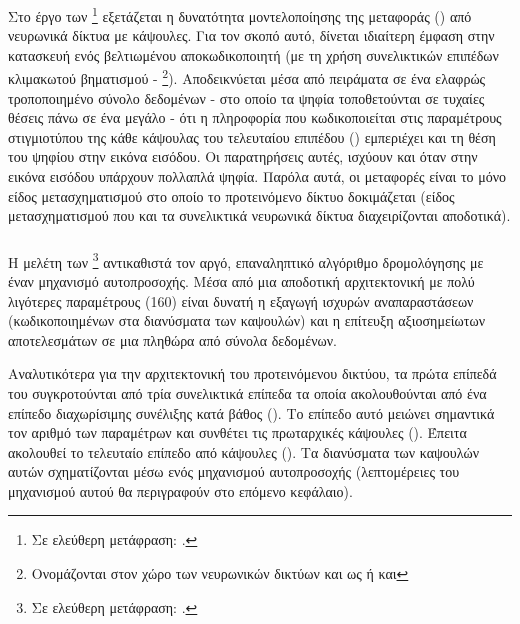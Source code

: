 \subsubsection{}

Στο έργο των  \footnote{Σε ελεύθερη μετάφραση: .} \cite{luo2020capsnet} εξετάζεται η δυνατότητα μοντελοποίησης της μεταφοράς () από νευρωνικά δίκτυα με κάψουλες. Για τον σκοπό αυτό, δίνεται ιδιαίτερη έμφαση στην κατασκευή ενός βελτιωμένου αποκωδικοποιητή (με τη χρήση συνελικτικών επιπέδων κλιμακωτού βηματισμού - \footnote{Ονομάζονται στον χώρο των νευρωνικών δικτύων και ως  ή και }). Αποδεικνύεται μέσα από πειράματα σε ένα ελαφρώς τροποποιημένο σύνολο δεδομένων  - στο οποίο τα ψηφία τοποθετούνται σε τυχαίες θέσεις πάνω σε ένα μεγάλο  - ότι η πληροφορία που κωδικοποιείται στις παραμέτρους στιγμιοτύπου της κάθε κάψουλας του τελευταίου επιπέδου () εμπεριέχει και τη θέση του ψηφίου στην εικόνα εισόδου. Οι παρατηρήσεις αυτές, ισχύουν και όταν στην εικόνα εισόδου υπάρχουν πολλαπλά ψηφία. Παρόλα αυτά, οι μεταφορές είναι το μόνο είδος μετασχηματισμού στο οποίο το προτεινόμενο δίκτυο δοκιμάζεται (είδος μετασχηματισμού που και τα συνελικτικά νευρωνικά δίκτυα διαχειρίζονται αποδοτικά).

\subsubsection{}

Η μελέτη των  \footnote{Σε ελεύθερη μετάφραση: .} \cite{mazzia2021efficient} αντικαθιστά τον αργό, επαναληπτικό αλγόριθμο δρομολόγησης με έναν μηχανισμό αυτο\textendash προσοχής. Μέσα από μια αποδοτική αρχιτεκτονική με πολύ λιγότερες παραμέτρους (160) είναι δυνατή η εξαγωγή ισχυρών αναπαραστάσεων (κωδικοποιημένων στα διανύσματα των καψουλών) και η επίτευξη αξιοσημείωτων αποτελεσμάτων σε μια πληθώρα από σύνολα δεδομένων.\par

 Αναλυτικότερα για την αρχιτεκτονική του προτεινόμενου δικτύου, τα πρώτα επίπεδά του συγκροτούνται από τρία συνελικτικά επίπεδα τα οποία ακολουθούνται από ένα επίπεδο διαχωρίσιμης συνέλιξης κατά βάθος (). Το επίπεδο αυτό μειώνει σημαντικά τον αριθμό των παραμέτρων και συνθέτει τις πρωταρχικές κάψουλες (). Έπειτα ακολουθεί το τελευταίο επίπεδο από κάψουλες  (). Τα διανύσματα των καψουλών αυτών σχηματίζονται μέσω ενός μηχανισμού αυτο\textendash προσοχής (λεπτομέρειες του μηχανισμού αυτού θα περιγραφούν στο επόμενο κεφάλαιο).\par

